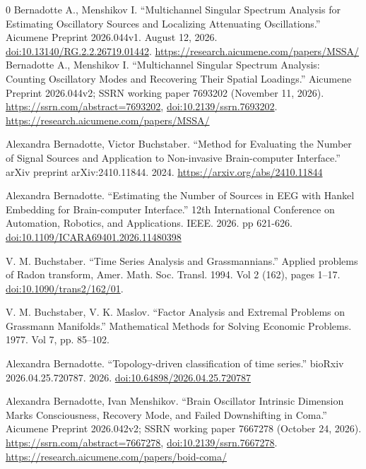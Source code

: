 \documentclass{article}
\begin{document}
\renewcommand{\refname}{REFERENCES}
 \begin{thebibliography}{0}
 Bernadotte A., Menshikov I. ``Multichannel Singular Spectrum Analysis for Estimating Oscillatory Sources and Localizing Attenuating Oscillations.'' Aicumene Preprint 2026.044v1. August 12, 2026. \href{https://doi.org/10.13140/RG.2.2.26719.01442}{doi:10.13140/RG.2.2.26719.01442}. \url{https://research.aicumene.com/papers/MSSA/}
 Bernadotte A., Menshikov I. ``Multichannel Singular Spectrum Analysis: Counting Oscillatory Modes and Recovering Their Spatial Loadings.'' Aicumene Preprint 2026.044v2; SSRN working paper 7693202 (November 11, 2026). \url{https://ssrn.com/abstract=7693202}, \href{https://doi.org/10.2139/ssrn.7693202}{doi:10.2139/ssrn.7693202}. \url{https://research.aicumene.com/papers/MSSA/}


 Alexandra Bernadotte, Victor Buchstaber. ``Method for Evaluating the Number of Signal Sources and Application to Non-invasive Brain-computer Interface.'' arXiv preprint arXiv:2410.11844. 2024. \url{https://arxiv.org/abs/2410.11844}

 Alexandra Bernadotte. ``Estimating the Number of Sources in EEG with Hankel Embedding for Brain-computer Interface.'' 12th International Conference on Automation, Robotics, and Applications. IEEE. 2026. pp 621-626. \href{https://doi.org/10.1109/ICARA69401.2026.11480398}{doi:10.1109/ICARA69401.2026.11480398}

 V. M. Buchstaber. ``Time Series Analysis and Grassmannians.''  Applied problems of Radon transform, Amer. Math. Soc. Transl. 1994. Vol 2 (162), pages 1--17. \href{https://doi.org/10.1090/trans2/162/01}{doi:10.1090/trans2/162/01}.

 V. M. Buchstaber, V. K. Maslov. ``Factor Analysis and Extremal Problems on Grassmann Manifolds.'' Mathematical Methods for Solving Economic Problems. 1977. Vol 7, pp. 85--102.

 Alexandra Bernadotte.  ``Topology-driven classification of time series.'' bioRxiv 2026.04.25.720787. 2026. \href{https://doi.org/10.64898/2026.04.25.720787}{doi:10.64898/2026.04.25.720787}

 Alexandra Bernadotte, Ivan Menshikov. ``Brain Oscillator Intrinsic Dimension Marks Consciousness, Recovery Mode, and Failed Downshifting in Coma.'' Aicumene Preprint 2026.042v2; SSRN working paper 7667278 (October 24, 2026). \url{https://ssrn.com/abstract=7667278}, \href{https://doi.org/10.2139/ssrn.7667278}{doi:10.2139/ssrn.7667278}. \url{https://research.aicumene.com/papers/boid-coma/}


\end{thebibliography}
\end{document}
